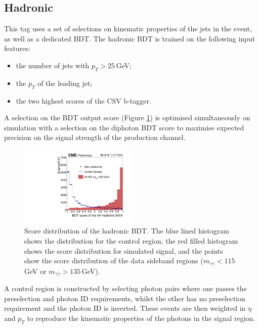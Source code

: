 \subsection{\ttH Hadronic}
This tag uses a set of selections on kinematic properties of the jets in the event, as well as a dedicated BDT. The \ttH hadronic BDT is trained on the following input features:
\begin{itemize}[noitemsep]
    \item the number of jets with $p_{T} > 25$\,GeV;
    \item the $p_{T}$ of the leading jet;
    \item the two highest scores of the CSV b-tagger.
\end{itemize}
A selection on the BDT output score (Figure \ref{fig:event_categorisaton:tth_hadronic_bdt}) is optimised simultaneously on simulation with a selection on the diphoton BDT score to maximise expected precision on the signal strength of the \ttH production channel. 
\begin{figure}[h!]
    \includegraphics[width=0.49\textwidth]{figures/event_selection/Figure_006.pdf}
    \caption{Score distribution of the hadronic \ttH BDT. The blue lined histogram shows the distribution for the control region, the red filled histogram shows the score distribution for simulated signal, and the points show the score distribution of the data sideband regions ($m_{\gamma\gamma} < 115$\,GeV or $m_{\gamma\gamma} > 135$\,GeV).}
        \label{fig:event_categorisaton:tth_hadronic_bdt}
\end{figure}

A control region is constructed by selecting photon pairs where one passes the preselection and photon ID requirements, whilst the other has no preselection requirement and the photon ID is inverted.
These events are then weighted in $\eta$ and $p_T$ to reproduce the kinematic properties of the photons in the signal region.

